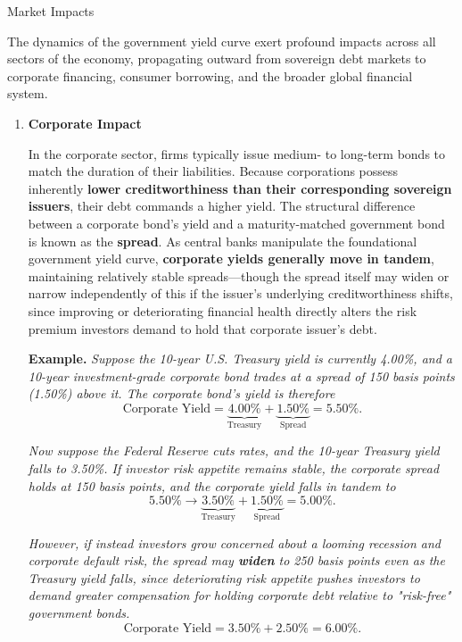 \documentclass[10pt]{article}
\begin{document}
    \begin{core}[label=core:market_impact]{Market Impacts}

      The dynamics of the government yield curve exert profound impacts across all sectors of the economy, propagating outward from sovereign debt markets to corporate financing, consumer borrowing, and the broader global financial system.

      \begin{enumerate}

        \item \textbf{Corporate Impact}

        In the corporate sector, firms typically issue medium- to long-term bonds to match the duration of their liabilities. Because corporations possess inherently \textbf{lower creditworthiness than their corresponding sovereign issuers}, their debt commands a higher yield. The structural difference between a corporate bond's yield and a maturity-matched government bond is known as the \textbf{spread}. As central banks manipulate the foundational government yield curve, \textbf{corporate yields generally move in tandem}, maintaining relatively stable spreads---though the spread itself may widen or narrow independently of this if the issuer's underlying creditworthiness shifts, since improving or deteriorating financial health directly alters the risk premium investors demand to hold that corporate issuer's debt.

        \textbf{Example.} \textit{Suppose the 10-year U.S. Treasury yield is currently 4.00\%, and a 10-year investment-grade corporate bond trades at a spread of 150 basis points (1.50\%) above it. The corporate bond's yield is therefore}
        \[
          \text{Corporate Yield} = \underbrace{4.00\%}_{\text{Treasury}} + \underbrace{1.50\%}_{\text{Spread}} = 5.50\%.
        \]

        \textit{Now suppose the Federal Reserve cuts rates, and the 10-year Treasury yield falls to 3.50\%. If investor risk appetite remains stable, the corporate spread holds at 150 basis points, and the corporate yield falls in tandem to}
        \[
          5.50\% \rightarrow \underbrace{3.50\%}_{\text{Treasury}} + \underbrace{1.50\%}_{\text{Spread}} = 5.00\%.
        \]

        \textit{However, if instead investors grow concerned about a looming recession and corporate default risk, the spread may \textbf{widen} to 250 basis points even as the Treasury yield falls, since deteriorating risk appetite pushes investors to demand greater compensation for holding corporate debt relative to "risk-free" government bonds.}
        \[
          \text{Corporate Yield} = 3.50\% + 2.50\% = 6.00\%.
        \]


\end{enumerate}
\end{core}
\end{document}
